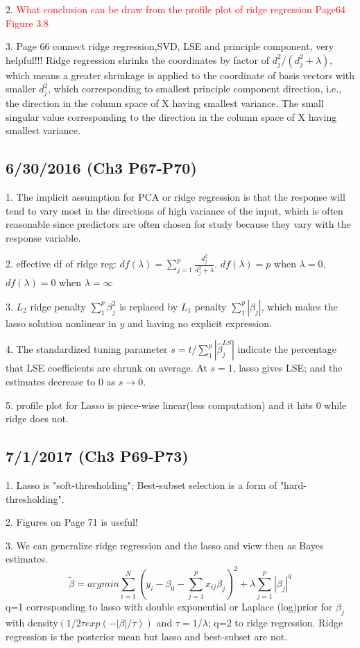\documentclass[a4paper, 12pt]{article}
\begin{document}
2. \textcolor{red}{What conclusion can be draw from the profile plot of ridge regression Page64 Figure 3.8}

3. Page 66 connect ridge regression,SVD, LSE and principle component, very helpful!!! Ridge regression shrinks the coordinates by factor of $d^2_j/(d^2_j+\lambda)$, which means a greater shrinkage is applied to the coordinate of basis vectors with smaller $d^2_j$, which corresponding to smallest principle component direction, i.e., the direction in the column space of X having smallest variance. The small singular value corresponding to the direction in the column space of X having smallest variance.

\subsection*{6/30/2016 (Ch3 P67-P70)}

1. The implicit assumption for PCA or ridge regression is that the response will tend to vary most in the directions of high variance of the input, which is often reasonable since predictors are often chosen for study because they vary with the response variable.

2. effective df of ridge reg: $df(\lambda)=\sum_{j=1}^{p}\frac{d^2_j}{d^2_j+\lambda}$. $df(\lambda)=p$ when $\lambda=0$,$df(\lambda)=0$ when $\lambda=\infty$

3. $L_2$ ridge penalty $\sum_{1}^{p}\beta^2_j$ is replaced by $L_1$ penalty $\sum_{1}^{p}|\beta_j|$, which makes the lasso solution nonlinear in $y$ and having no explicit expression.

4. The standardized tuning parameter $s=t/\sum_{1}^{p}|\hat{\beta}^{LS}_j|$ indicate the percentage that LSE coefficients are shrunk on average. At $s=1$, lasso gives LSE; and the estimates decrease to 0 as $s \rightarrow 0$.

5. profile plot for Lasso is piece-wise linear(less computation) and it hits 0 while ridge does not.

\subsection*{7/1/2017 (Ch3 P69-P73)}

1. Lasso is "soft-thresholding"; Best-subset selection is a form of "hard-thresholding".

2. Figures on Page 71 is useful!

3. We can generalize ridge regression and the lasso and view then as Bayes estimates.
$$\tilde{\beta}=argmin{\sum_{i=1}^{N}(y_i-\beta_0-\sum_{j=1}^{p}x_{ij}\beta_j)^2 +\lambda\sum_{j=1}^{p}|\beta_j|^q}$$
q=1 corresponding to lasso with double exponential or Laplace (log)prior for $\beta_j$ with density$(1/2\tau exp(-|\beta|/\tau))$ and $\tau=1/\lambda$; q=2 to ridge regression. Ridge regression is the posterior mean but lasso and best-subset are not.
\end{document}
